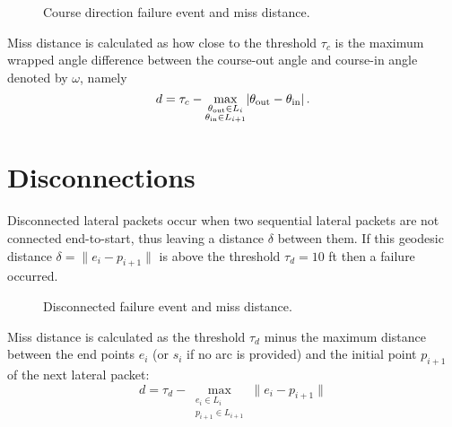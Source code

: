 \begin{figure}[!ht]
\centering
\resizebox{0.6\columnwidth}{!}{}
\caption{Course direction failure event and miss distance.}
\label{fig:course_direction}
\end{figure}

Miss distance is calculated as how close to the threshold $\tau_c$ is the maximum wrapped angle difference between the course-out angle and course-in angle denoted by $\omega$, namely
\begin{equation*}
    d = \tau_c - \max\limits_{\substack{\theta_\text{out} \in L_i\\\theta_\text{in} \in L_{i+1}}}\abs{\theta_\text{out} - \theta_\text{in}}.
\end{equation*}

\section{Disconnections}
Disconnected lateral packets occur when two sequential lateral packets are not connected end-to-start, thus leaving a distance $\delta$ between them. If this geodesic distance $\delta = \lVert e_i - p_{i+1} \rVert$ is above the threshold $\tau_d = 10$ \si{ft} then a failure occurred.

\begin{figure}[!ht]
\centering
\resizebox{0.6\columnwidth}{!}{}
\caption{Disconnected failure event and miss distance.}
\label{fig:disconnection}
\end{figure}

Miss distance is calculated as the threshold $\tau_d$ minus the maximum distance between the end points $e_i$ (or $s_i$ if no arc is provided) and the initial point $p_{i+1}$ of the next lateral packet:
\begin{equation*}
    d = \tau_d - \max\limits_{\substack{e_i \in L_i\\p_{i+1} \in L_{i+1}}}\lVert e_i - p_{i+1} \rVert
\end{equation*}
